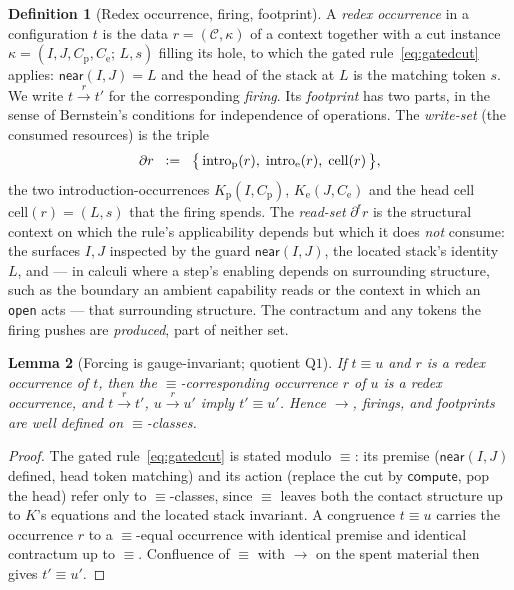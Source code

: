 \documentclass[11pt]{article}
\theoremstyle{definition}
\newtheorem{definition}{Definition}[section]
\theoremstyle{plain}
\newtheorem{lemma}[definition]{Lemma}
\newcommand{\near}{\mathsf{near}}
\newcommand{\compute}{\mathsf{compute}}
\newcommand{\Kp}{K_{\mathrm{p}}}
\newcommand{\Ke}{K_{\mathrm{e}}}
\newcommand{\Seq}{\equiv}
\newcommand{\red}{\longrightarrow}
\newcommand{\foot}{\partial}                       %
\newcommand{\rfoot}{\partial^{\mathsf r}}          %
\newcommand{\fire}[1]{\xrightarrow{\;#1\;}}
\newcommand{\defeq}{\;\mathrel{\vcentcolon=}\;}
\theoremstyle{remark}
\begin{document}
\begin{definition}[Redex occurrence, firing, footprint]
\label{def:firing}
A \emph{redex occurrence} in a configuration $t$ is the data
$r = (\mathcal{C}, \kappa)$ of a context together with a cut instance
$\kappa = (I,J,C_{\mathrm p},C_{\mathrm e};\, L, s)$ filling its hole, to
which the gated rule~\eqref{eq:gatedcut} applies: $\near(I,J)=L$ and the
head of the stack at $L$ is the matching token $s$. We write
$t \fire{r} t'$ for the corresponding \emph{firing}. Its
\emph{footprint} has two parts, in the sense of Bernstein's conditions
for independence of operations. The \emph{write-set} (the consumed
resources) is the triple
\[
  \foot r \;\defeq\;
  \bigl\{\, \mathrm{intro}_{\mathrm p}(r),\;
            \mathrm{intro}_{\mathrm e}(r),\;
            \mathrm{cell}(r) \,\bigr\},
\]
the two introduction-occurrences $\Kp(I,C_{\mathrm p})$,
$\Ke(J,C_{\mathrm e})$ and the head cell $\mathrm{cell}(r)=(L,s)$ that
the firing spends. The \emph{read-set} $\rfoot r$ is the structural
context on which the rule's applicability depends but which it does
\emph{not} consume: the surfaces $I,J$ inspected by the guard
$\near(I,J)$, the located stack's identity $L$, and --- in calculi where
a step's enabling depends on surrounding structure, such as the boundary
an ambient capability reads or the context in which an \texttt{open}
acts --- that surrounding structure. The contractum and any tokens the
firing pushes are \emph{produced}, part of neither set.
\end{definition}

\begin{lemma}[Forcing is gauge-invariant; quotient $\mathrm{Q1}$]
\label{lem:gauge}
If $t \Seq u$ and $r$ is a redex occurrence of $t$, then the
$\Seq$-corresponding occurrence $r$ of $u$ is a redex occurrence, and
$t \fire{r} t'$, $u \fire{r} u'$ imply $t' \Seq u'$. Hence $\red$,
firings, and footprints are well defined on $\Seq$-classes.
\end{lemma}

\begin{proof}
The gated rule~\eqref{eq:gatedcut} is stated modulo $\Seq$: its premise
($\near(I,J)$ defined, head token matching) and its action (replace the
cut by $\compute$, pop the head) refer only to $\Seq$-classes, since
$\Seq$ leaves both the contact structure up to $K$'s equations and the
located stack invariant. A congruence $t \Seq u$ carries the occurrence
$r$ to a $\Seq$-equal occurrence with identical premise and identical
contractum up to $\Seq$. Confluence of $\Seq$ with $\red$ on the spent
material then gives $t' \Seq u'$.
\end{proof}
\end{document}
